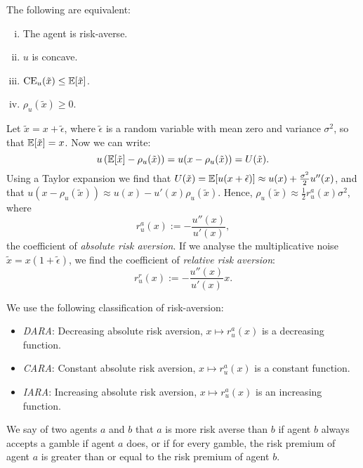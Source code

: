 \documentclass[twoside, titlepage]{article}
\begin{document}
\begin{proposition}
    The following are equivalent:
    \begin{enumerate}[(i)]
        \item The agent is risk-averse.
        \item $u$ is concave.
        \item $\text{CE}_u(\tilde{x}) \leq \mathbb{E}[\tilde{x}]$.
        \item $\rho_u(\tilde{x}) \geq 0$.
    \end{enumerate}
\end{proposition}
Let $\tilde{x} = x + \tilde{\epsilon}$, where $\tilde{\epsilon}$ is a random variable with mean zero and variance $\sigma^2$, so that $\mathbb{E}[\tilde{x}] = x$. Now we can write:
\[
    u\left(\mathbb{E}[\tilde{x}] - \rho_u(\tilde{x})\right) = u(x - \rho_u(\tilde{x})) = U(\tilde{x}).
\]
Using a Taylor expansion we find that $U(\tilde{x}) = \mathbb{E}[u(x + \tilde{\epsilon})] \approx u(x) + \frac{\sigma^2}{2}u''(x)$, and that $u(x - \rho_u(\tilde{x}))  \approx u(x) - u'(x)\rho_u(\tilde{x})$. Hence, $\rho_u(\tilde{x}) \approx \frac{1}{2} r^a_u(x)\sigma^2$, where
\[
    r^a_u(x) := -\frac{u''(x)}{u'(x)},
\]
the coefficient of \textit{absolute risk aversion}. If we analyse the multiplicative noise $\tilde{x} = x(1 + \tilde{\epsilon})$, we find the coefficient of \textit{relative risk aversion}:
\[
    r^r_u(x) := -\frac{u''(x)}{u'(x)}x.
\]

We use the following classification of risk-aversion:
\begin{itemize}
    \item \textit{DARA}: Decreasing absolute risk aversion, $x \mapsto r^a_u(x)$ is a decreasing function.
    \item \textit{CARA}: Constant absolute risk aversion, $x \mapsto r^a_u(x)$ is a constant function.
    \item \textit{IARA}: Increasing absolute risk aversion, $x \mapsto r^a_u(x)$ is an increasing function.
\end{itemize}
We say of two agents $a$ and $b$ that $a$ is more risk averse than $b$ if agent $b$ always accepts a gamble if agent $a$ does, or if for every gamble, the risk premium of agent $a$ is greater than or equal to the risk premium of agent $b$.

\end{document}
